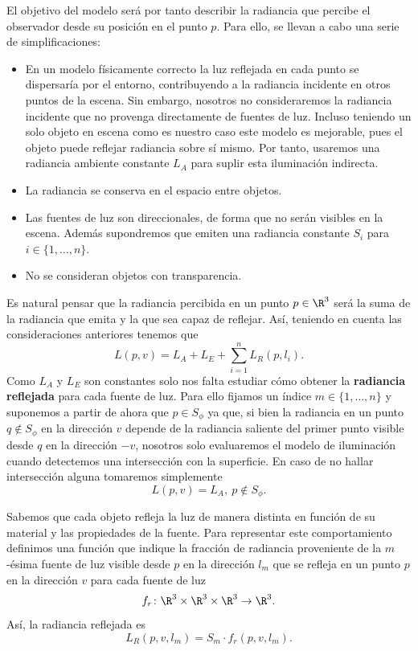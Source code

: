 El objetivo del modelo será por tanto describir la radiancia que percibe el observador desde su posición en el punto $p$. Para ello, se llevan a cabo una serie de simplificaciones:
\begin{itemize}
    \item En un modelo físicamente correcto la luz reflejada en cada punto se dispersaría por el entorno, contribuyendo a la radiancia incidente en otros puntos de la escena. Sin embargo, nosotros no consideraremos la radiancia incidente que no provenga directamente de fuentes de luz. Incluso teniendo un solo objeto en escena como es nuestro caso este modelo es mejorable, pues el objeto puede reflejar radiancia sobre sí mismo. Por tanto, usaremos una radiancia ambiente constante $L_A$ para suplir esta iluminación indirecta.
    \item La radiancia se conserva en el espacio entre objetos.
    \item Las fuentes de luz son direccionales, de forma que no serán visibles en la escena. Además supondremos que emiten una radiancia constante $S_i$ para $i\in \{1,\dots, n\}$.
    \item No se consideran objetos con transparencia.
\end{itemize}
Es natural pensar que la radiancia percibida en un punto $p\in \R^3$ será la suma de la radiancia que emita y la que sea capaz de reflejar. Así, teniendo en cuenta las consideraciones anteriores tenemos que
\begin{equation*}
    L(p,v) = L_A + L_E + \sum_{i=1}^n L_R(p,l_i).
\end{equation*}
Como $L_A$ y $L_E$ son constantes solo nos falta estudiar cómo obtener la \textbf{radiancia reflejada} para cada fuente de luz. Para ello fijamos un índice $m\in \{1,\dots,n\}$ y suponemos a partir de ahora que $p\in S_{\phi}$ ya que, si bien la radiancia en un punto $q\notin S_{\phi}$ en la dirección $v$ depende de la radiancia saliente del primer punto visible desde $q$ en la dirección $-v$, nosotros solo evaluaremos el modelo de iluminación cuando detectemos una intersección con la superficie. En caso de no hallar intersección alguna tomaremos simplemente
\begin{equation*}
    L(p,v) = L_A,\ p\notin S_{\phi}.
\end{equation*}

Sabemos que cada objeto refleja la luz de manera distinta en función de su material y las propiedades de la fuente. Para representar este comportamiento definimos una función que indique la fracción de radiancia proveniente de la $m$-ésima fuente de luz visible desde $p$ en la dirección $l_m$ que se refleja en un punto $p$ en la dirección $v$ para cada fuente de luz
\begin{equation*}
    f_r \colon \R^3\times \R^3\times \R^3 \to \R^3.
\end{equation*}
Así, la radiancia reflejada es
\begin{equation*}
    L_R(p,v,l_m) = S_m\cdot f_r(p,v,l_m).
\end{equation*}


